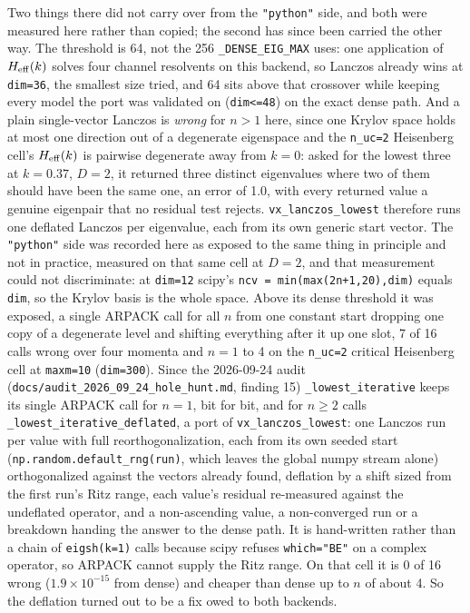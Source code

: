 \documentclass[11pt]{article}
\begin{document}
Two things there did not carry over from the \texttt{"python"} side,
and both were measured here rather than copied; the second has since
been carried the other way. The threshold is 64, not the
256 \texttt{\_DENSE\_EIG\_MAX} uses: one application of $H_{\rm eff}(k)$
solves four channel resolvents on this backend, so Lanczos already wins
at \texttt{dim=36}, the smallest size tried, and 64 sits above that
crossover while keeping every model the port was validated on
(\texttt{dim<=48}) on the exact dense path. And a plain single-vector
Lanczos is \emph{wrong} for $n>1$ here, since one Krylov space holds at
most one direction out of a degenerate eigenspace and the
\texttt{n\_uc=2} Heisenberg cell's $H_{\rm eff}(k)$ is pairwise
degenerate away from $k=0$: asked for the lowest three at $k=0.37$,
$D=2$, it returned three distinct eigenvalues where two of them should
have been the same one, an error of 1.0, with every returned value a
genuine eigenpair that no residual test rejects.
\texttt{vx\_lanczos\_lowest} therefore runs one deflated Lanczos per
eigenvalue, each from its own generic start vector. The
\texttt{"python"} side was recorded here as exposed to the same thing in
principle and not in practice, measured on that same cell at $D=2$, and
that measurement could not discriminate: at \texttt{dim=12} scipy's
\texttt{ncv = min(max(2n+1,20),dim)} equals \texttt{dim}, so the Krylov
basis is the whole space. Above its dense threshold it was exposed, a
single ARPACK call for all $n$ from one constant start dropping one copy
of a degenerate level and shifting everything after it up one slot, 7 of
16 calls wrong over four momenta and $n=1$ to 4 on the \texttt{n\_uc=2}
critical Heisenberg cell at \texttt{maxm=10} (\texttt{dim=300}). Since
the 2026-09-24 audit (\texttt{docs/audit\_2026\_09\_24\_hole\_hunt.md},
finding 15) \texttt{\_lowest\_iterative} keeps its single ARPACK call
for $n=1$, bit for bit, and for $n\ge2$ calls
\texttt{\_lowest\_iterative\_deflated}, a port of
\texttt{vx\_lanczos\_lowest}: one Lanczos run per value with full
reorthogonalization, each from its own seeded start
(\texttt{np.random.default\_rng(run)}, which leaves the global numpy
stream alone) orthogonalized against the vectors already found,
deflation by a shift sized from the first run's Ritz range, each value's
residual re-measured against the undeflated operator, and a
non-ascending value, a non-converged run or a breakdown handing the
answer to the dense path. It is hand-written rather than a chain of
\texttt{eigsh(k=1)} calls because scipy refuses \texttt{which="BE"} on
a complex operator, so ARPACK cannot supply the Ritz range. On that cell
it is 0 of 16 wrong ($1.9\times10^{-15}$ from dense) and cheaper than
dense up to $n$ of about 4. So the deflation turned out to be a fix owed
to both backends.
\end{document}
